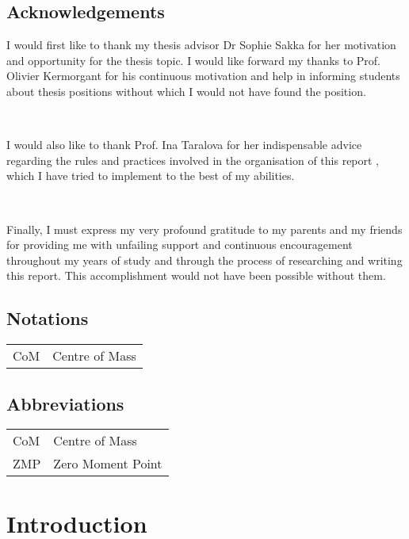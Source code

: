 \documentclass{report}
\begin{document}
 \section*{Acknowledgements}
 
 I would first like to thank my thesis advisor Dr Sophie Sakka for her motivation and opportunity for the thesis topic.
  I would like forward my thanks to Prof. Olivier Kermorgant for his continuous motivation and help in informing 
  students about thesis positions without which I would not have found the position. 

~

I would also like to thank Prof. Ina Taralova for her indispensable advice regarding the rules and practices involved 
in the organisation of this report , which I have tried to implement to the best of my abilities.

~

Finally, I must express my very profound gratitude to my parents and my friends for providing me with unfailing 
support and continuous encouragement throughout my years of study and through the process of researching and writing 
this report. This accomplishment would not have been possible without them.
 \newpage
 
 
\section*{Notations}
    \begin{tabular}{p{3cm}p{10cm}}
    CoM & Centre of Mass
    \end{tabular}

\newpage

\section*{Abbreviations}

\begin{tabular}{p{3cm}p{10cm}}
CoM & Centre of Mass \\
ZMP & Zero Moment Point \\

\end{tabular}

 \newpage
 
 \tableofcontents
 
 \listoffigures
 
\listoftables
 

 
 
 \chapter*{Introduction}
 
\end{document}
